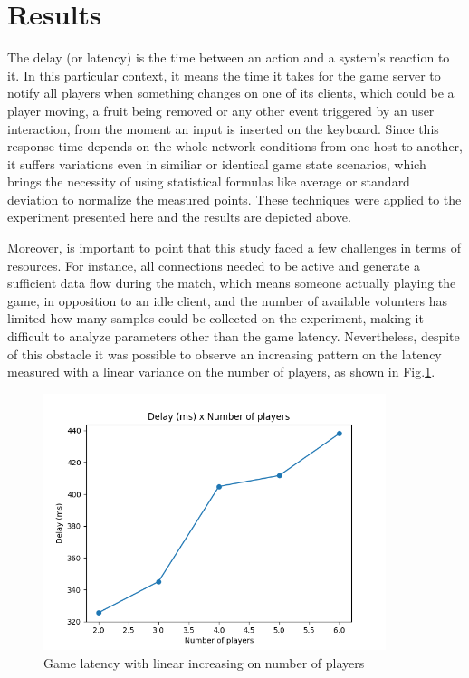 \documentclass[english]{sbrt}
\begin{document}
\section{\textbf{Results}}

The delay (or latency) is the time between an action and a system's reaction to it. In this particular context, it means the time it takes for the game server to notify all players when something changes on one of its clients, which could be a player moving, a fruit being removed or any other event triggered by an user interaction, from the moment an input is inserted on the keyboard. Since this response time depends on the whole network conditions from one host to another, it suffers variations even in similiar or identical game state scenarios, which brings the necessity of using statistical formulas like average or standard deviation to normalize the measured points. These techniques were applied to the experiment presented here and the results are depicted above.

Moreover, is important to point that this study faced a few challenges in terms of resources. For instance, all connections needed to be active and generate a sufficient data flow during the match, which means someone actually playing the game, in opposition to an idle client, and the number of available volunters has limited how many samples could be collected on the experiment, making it difficult to analyze parameters other than the game latency. Nevertheless, despite of this obstacle it was possible to observe an increasing pattern on the latency measured with a linear variance on the number of players, as shown in Fig.\ref{latency}.

\begin{figure}[H]
  \centering
  \includegraphics[width=10cm]{graphs/graph.png}
  \caption{Game latency with linear increasing on number of players}
  \label{latency}
\end{figure}
\end{document}
